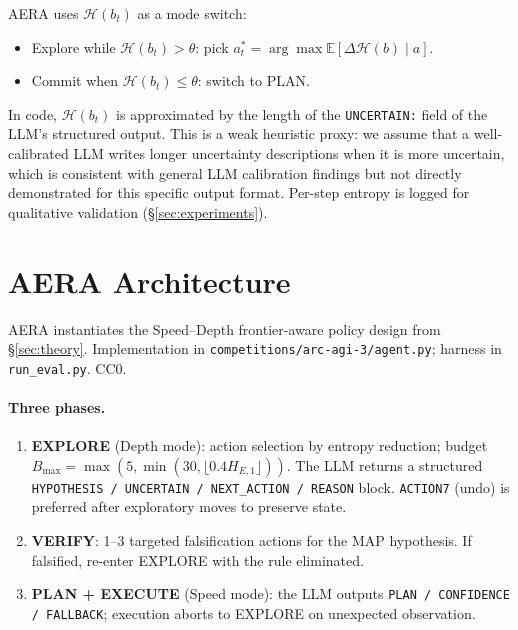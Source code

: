 \documentclass[11pt]{article}
\begin{document}
AERA uses $\mathcal{H}(b_t)$ as a mode switch:
\begin{itemize}[leftmargin=*]
\item Explore while $\mathcal{H}(b_t) > \theta$: pick $a_t^* = \arg\max \mathbb{E}[\Delta\mathcal{H}(b) \mid a]$.
\item Commit when $\mathcal{H}(b_t) \leq \theta$: switch to PLAN.
\end{itemize}

In code, $\mathcal{H}(b_t)$ is approximated by the length of the \texttt{UNCERTAIN:} field of the LLM's structured output. This is a weak heuristic proxy: we assume that a well-calibrated LLM writes longer uncertainty descriptions when it is more uncertain, which is consistent with general LLM calibration findings \cite{kadavath2022} but not directly demonstrated for this specific output format. Per-step entropy is logged for qualitative validation (\S\ref{sec:experiments}).

\section{AERA Architecture}
\label{sec:arch}

AERA instantiates the Speed--Depth frontier-aware policy design from \S\ref{sec:theory}. Implementation in \texttt{competitions/arc-agi-3/agent.py}; harness in \texttt{run\_eval.py}. CC0.

\paragraph{Three phases.}
\begin{enumerate}[leftmargin=*]
\item \textbf{EXPLORE} (Depth mode): action selection by entropy reduction; budget $B_{\max} = \max(5, \min(30, \lfloor 0.4 H_{E,1} \rfloor))$. The LLM returns a structured \texttt{HYPOTHESIS / UNCERTAIN / NEXT\_ACTION / REASON} block. \texttt{ACTION7} (undo) is preferred after exploratory moves to preserve state.
\item \textbf{VERIFY}: 1--3 targeted falsification actions for the MAP hypothesis. If falsified, re-enter EXPLORE with the rule eliminated.
\item \textbf{PLAN + EXECUTE} (Speed mode): the LLM outputs \texttt{PLAN / CONFIDENCE / FALLBACK}; execution aborts to EXPLORE on unexpected observation.
\end{enumerate}
\end{document}
